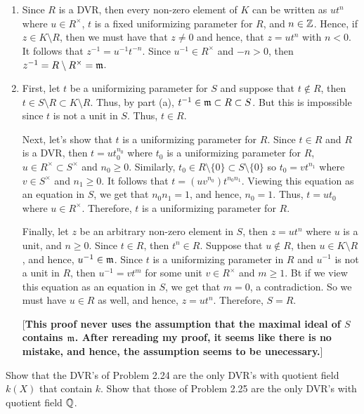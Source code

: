 \begin{solution}
    \begin{enumerate}
        \item Since $R$ is a DVR, then every non-zero element of $K$ can be written as $ut^n$ where $u \in R^{\times}$, $t$ is a fixed uniformizing parameter for $R$, and $n \in \mathbb{Z}$. Hence, if $z \in K \setminus R$, then we must have that $z \neq 0$ and hence, that $z = ut^n$ with $n < 0$. It follows that $z^{-1} = u^{-1}t^{-n}$. Since $u^{-1} \in R^{\times}$ and $-n > 0$, then $z^{-1} = R \setminus R^{\times} = \mathfrak{m}$.
        \item First, let $t$ be a uniformizing parameter for $S$ and suppose that $t \notin R$, then $t \in S\setminus R \subset K \setminus R$. Thus, by part (a), $t^{-1} \in \mathfrak{m} \subset R \subset S$. But this is impossible since $t$ is not a unit in $S$. Thus, $t \in R$. 
        
        Next, let's show that $t$ is a uniformizing parameter for $R$. Since $t \in R$ and $R$ is a DVR, then $t = ut_0^{n_0}$ where $t_0$ is a uniformizing parameter for $R$, $u \in R^{\times} \subset S^{\times}$ and $n_0 \geq 0$. Similarly, $t_0 \in R\setminus\{0\} \subset S\setminus\{0\}$ so $t_0 = vt^{n_1}$ where $v \in S^{\times}$ and $n_1 \geq 0$. It follows that $t = (uv^{n_0})t^{n_0n_1}$. Viewing this equation as an equation in $S$, we get that $n_0n_1 = 1$, and hence, $n_0 = 1$. Thus, $t = ut_0$ where $u \in R^{\times}$. Therefore, $t$ is a uniformizing parameter for $R$.

        Finally, let $z$ be an arbitrary non-zero element in $S$, then $z = ut^n$ where $u$ is a unit, and $n \geq 0$. Since $t \in R$, then $t^n \in R$. Suppose that $u \notin R$, then $u \in K \setminus R$, and hence, $u^{-1} \in \mathfrak{m}$. Since $t$ is a uniformizing parameter in $R$ and $u^{-1}$ is not a unit in $R$, then $u^{-1} = vt^m$ for some unit $v \in R^{\times}$ and $m \geq 1$. Bt if we view this equation as an equation in $S$, we get that $m = 0$, a contradiction. So we must have $u \in R$ as well, and hence, $z = ut^n$. Therefore, $S = R$. 
        
        [\textbf{This proof never uses the assumption that the maximal ideal of $S$ contains $\mathfrak{m}$. After rereading my proof, it seems like there is no mistake, and hence, the assumption seems to be unecessary.}]\\
    \end{enumerate}
\end{solution}

\begin{exercise}
    Show that the DVR's of Problem 2.24 are the only DVR's with quotient field $k(X)$ that contain $k$. Show that those of Problem 2.25 are the only DVR's with quotient field $\mathbb{Q}$. \\
\end{exercise}

